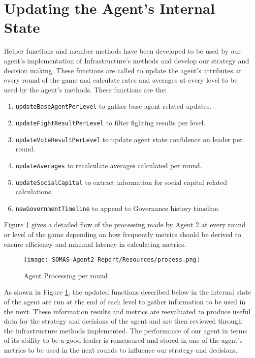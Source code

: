 \section{Updating the Agent's Internal State}
Helper functions and member methods have been developed to be used by our agent's implementation of Infrastructure's methods and develop our strategy and decision making. These functions are called to update the agent's attributes at every round of the game and calculate rates and averages at every level to be used by the agent's methods. These functions are the:
\begin{enumerate}
    \item \verb|updateBaseAgentPerLevel| to gather base agent related updates.
    \item \verb|updateFightResultPerLevel| to filter fighting results per level.
    \item \verb|updateVoteResultPerLevel| to update agent state confidence on leader per round.
    \item \verb|updateAverages| to recalculate averages calculated per round.
    \item \verb|updateSocialCapital| to extract information for social capital related calculations.
    \item \verb|newGovernmentTimeline| to append to Governance history timeline.
\end{enumerate}

Figure \ref{fig:Process} gives a detailed flow of the processing made by Agent 2 at every round or level of the game depending on how frequently metrics should be derived to ensure efficiency and minimal latency in calculating metrics.

\begin{figure}[!ht]
    \centering
    \texttt{[image: SOMAS-Agent2-Report/Resources/process.png]}
    \caption{Agent Processing per round}
    \label{fig:Process}
\end{figure}

As shown in Figure \ref{fig:Process}, the updated functions described below in the internal state of the agent are run at the end of each level to gather information to be used in the next. These information results and metrics are reevaluated to produce useful data for the strategy and decisions of the agent and are then reviewed through the infrastructure methods implemented. The performance of our agent in terms of its ability to be a good leader is remeasured and stored in one of the agent's metrics to be used in the next rounds to influence our strategy and decisions.

